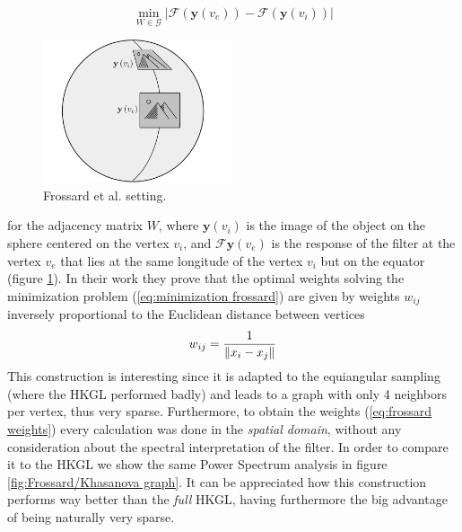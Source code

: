 \begin{equation}\label{eq:minimization frossard}
	\min_{W\in\mathcal G} \left|\mathcal{F}\left(\mathbf{y}\left(v_{ e}\right)\right)-\mathcal{F}\left(\mathbf{y}\left(v_{ i}\right)\right)\right|
\end{equation}
\begin{figure}
	\begin{center}
		\includegraphics[width=0.5\textwidth]{figs/Chapter3/frossard2.png}
	\end{center}
	\caption{\label{fig:frossard2}Frossard et al. setting.}
\end{figure}
for the adjacency matrix $W$, where $\mathbf y(v_i)$ is the image of the object on the sphere centered on the vertex $v_i$, and $\mathcal F \mathbf y(v_e)$ is the response of the filter at the vertex $v_e$ that lies at the same longitude of the vertex $v_i$ but on the equator (figure \ref{fig:frossard2}). In their work they prove that the optimal weights solving the minimization problem (\ref{eq:minimization frossard}) are given by weights $w_{ij}$ inversely proportional to the Euclidean distance between vertices
\begin{equation}\label{eq:frossard weights}
	w_{ij} = \frac{1}{\left\lVert x_i-x_j\right\rVert}
\end{equation}
This construction is interesting since it is adapted to the equiangular sampling (where the HKGL performed badly) and leads to a graph with only 4 neighbors per vertex, thus very sparse. Furthermore, to obtain the weights (\ref{eq:frossard weights}) every calculation was done in the \textit{spatial domain}, without any consideration about the spectral interpretation of the filter. In order to compare it to the HKGL we show the same Power Spectrum analysis in figure \ref{fig:Frossard/Khasanova graph}. It can be appreciated how this construction performs way better than the \textit{full} HKGL, having furthermore the big advantage of being naturally very sparse.
